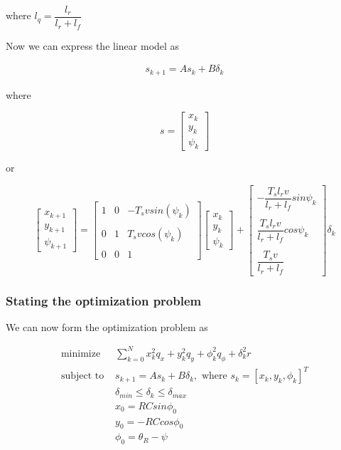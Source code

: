 where $l_q = \dfrac{l_r}{l_r + l_f}$




Now we can express the linear model as

\begin{align}
  s_{k+1} = A s_k + B \delta_k
\end{align}

where

\begin{equation}
  s=
  \begin{bmatrix}
    x_{k} \\
    y_{k} \\
    \psi_{k}
  \end{bmatrix}
\end{equation}

or

\begin{equation}
  \begin{bmatrix}
    x_{k+1} \\
    y_{k+1} \\
    \psi_{k+1}
  \end{bmatrix}
  =
  \begin{bmatrix}
    1 & 0 & -T_s v sin(\psi_k) \\\\
    0 & 1 & T_s v cos(\psi_k) \\\\
    0 & 0 & 1
  \end{bmatrix}
  \begin{bmatrix}
    x_{k} \\
    y_{k} \\
    \psi_{k}
  \end{bmatrix}
  +
  \begin{bmatrix}
    -\dfrac{T_s l_r v}{l_r + l_f} sin\psi_k \\\\
    \dfrac{T_s l_r v}{l_r + l_f} cos\psi_k \\\\
    \dfrac{T_s v}{l_r+l_f}
  \end{bmatrix}
  \delta_{k}
\end{equation}



\subsubsection{Stating the optimization problem}

We can now form the optimization problem as

\begin{align}
  \text{minimize }    & \sum\limits_{k=0}^N x_k^2 q_x + y_k^2 q_y + \phi_k^2 q_{\phi} + \delta_k^2 r \\
  \text{subject to }  & s_{k+1} = A s_k + B \delta_k,\text{ where } s_k = [x_k, y_k, \phi_k]^T \\
                      & \delta_{min} \leq \delta_k \leq \delta_{max} \\
                      & x_0 = RC sin\phi_0 \\
                      & y_0 = -RC cos\phi_0 \\
                      & \phi_0 = \theta_R - \psi
\end{align}
